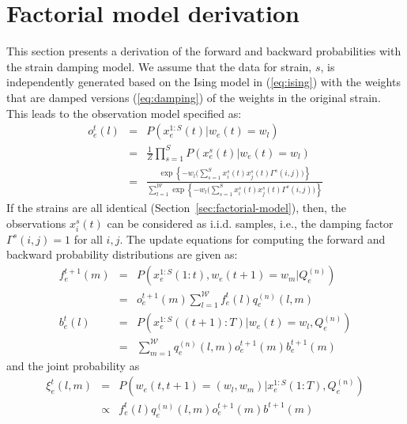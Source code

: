 \documentclass{bioinfo}
\begin{document}
\section{Factorial model derivation}
\label{sec:fact-model-deriv}
This section presents a derivation of the forward and backward
probabilities with the strain damping model. We assume that the data
for strain, $s$, is independently generated 
based on the Ising model in (\ref{eq:ising}) with the weights that are
damped versions (\ref{eq:damping}) of the weights in the original 
strain. This leads to the observation model specified as:
\begin{eqnarray}
  \label{eq:obs}
  o^{t}_{e}(l) &=& P(x_{e}^{1:S}(t) | w_{e}(t) = w_{l}) \\
\label{eq:obs2}
& = & \frac{1}{Z} \prod_{s=1}^{S} P(x_{e}^{s}(t) | w_{e}(t) = w_{l})
\\
\label{eq:obs3}
& = & \frac{\exp\left\{ - w_{l}\big(\sum_{s=1}^{S}
      x^{s}_{i}(t)x^{s}_{j}(t) \Gamma^{s}(i,j)\big)
  \right\}}{\sum^{\mathcal W}_{l=1}\exp\left\{ - w_{l}\big(\sum_{s=1}^{S}  x^{s}_{i}(t)x^{s}_{j}(t) \Gamma^{s}(i,j)\big) \right\}}
\end{eqnarray}
If the strains are all identical (Section~\ref{sec:factorial-model}),
then, the observations $x^{s}_{i}(t)$ can be considered as
i.i.d. samples, i.e., the damping factor $\Gamma^{s}(i,j) = 1$ for all
$i, j$. 
The update equations for computing the forward and backward
probability distributions are given as:
\begin{eqnarray}
  \label{eq:update}
  f^{t+1}_{e}(m) &=& P(x_{e}^{1:S}(1:t) , w_{e}(t+1) = w_{m} | Q^{(n)}_{e}) \\
&=& o^{t+1}_{e}(m) \sum_{l=1}^{{\mathcal W}} f_{e}^{t}(l) q_{e}^{(n)}(l, m) \\
  b^{t}_{e}(l) &=& P(x^{1:S}_{e}((t+1):T) | w_{e}(t) = w_{l},
  Q^{(n)}_{e})  \\
\label{eq:update-1}
&=& \sum_{m=1}^{{\mathcal W}} q_{e}^{(n)}(l, m) o^{t+1}_{e}(m) b^{t+1}_{e}(m)
\end{eqnarray}
and the joint probability as
\begin{eqnarray}
  \label{eq:p-joint}
  \xi_{e}^{t}(l,m) &=& P(w_{e}(t,t+1) =(w_{l}, w_{m}) |
  x^{1:S}_{e}(1:T), Q^{(n)}_{e}) \\
&\propto& f_{e}^{t}(l) q_{e}^{(n)}(l, m) o_{e}^{t+1}(m) b^{t+1}(m) 
\end{eqnarray}
\end{document}
